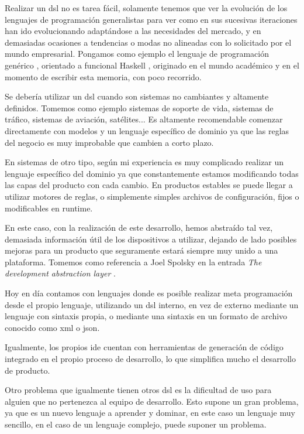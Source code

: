 Realizar un \gls{dsl} no es tarea fácil, solamente tenemos que ver la evolución de los lenguajes de programación generalistas para ver como en sus  sucesivas iteraciones han ido evolucionando adaptándose a las necesidades del mercado, y en demasiadas ocasiones a tendencias o modas no alineadas con lo solicitado por el mundo empresarial. Pongamos como ejemplo el lenguaje de programación genérico , orientado a funcional Haskell \cite{haskell}, originado en el mundo académico y en el momento de escribir esta memoria, con poco recorrido.

Se debería utilizar un \gls{dsl} cuando son sistemas no cambiantes y altamente definidos. Tomemos como ejemplo sistemas de soporte de vida, sistemas de tráfico, sistemas de aviación, satélites... Es altamente recomendable comenzar directamente con modelos y un lenguaje específico de dominio ya que las reglas del negocio es muy improbable que cambien a corto plazo.

En sistemas de otro tipo, según mi experiencia es muy complicado realizar un lenguaje específico del dominio ya que constantemente estamos modificando todas las capas del producto con cada cambio. En productos estables se puede llegar a utilizar motores de reglas, o simplemente simples archivos de configuración, fijos o modificables en \gls{runtime}.

En este caso, con la realización de este desarrollo, hemos abstraído tal vez, demasiada información útil de los dispositivos a utilizar, dejando de lado posibles mejoras para un producto que seguramente estará siempre muy unido a una plataforma. Tomemos como referencia a Joel Spolsky en la entrada \textit{The development abstraction layer} \cite{TheDevelopmentAbstractionLayer}.

Hoy en día contamos con lenguajes donde es posible realizar meta programación desde el propio lenguaje, utilizando un \gls{dsl} interno, en vez de externo mediante un lenguaje con sintaxis propia, o mediante una sintaxis en un formato de archivo conocido como  \gls{xml} o \gls{json}.

Igualmente, los propios \gls{ide} cuentan con herramientas de generación de código integrado en el propio proceso de desarrollo, lo que simplifica mucho el desarrollo de producto.

Otro problema que igualmente tienen otros \gls{dsl} es la dificultad de uso para alguien que no pertenezca al equipo de desarrollo. Esto supone un gran problema, ya que es un nuevo lenguaje a aprender y dominar, en este caso un lenguaje muy sencillo, en el caso de un lenguaje complejo, puede suponer un problema.

